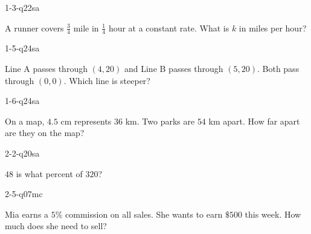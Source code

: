 
\begin{practiceQuestion}{1-3-q22}{sa}
\begin{questionText}
A runner covers $\frac{3}{4}$ mile in $\frac{1}{4}$ hour at a constant rate. What is $k$ in miles per hour?
\end{questionText}
\end{practiceQuestion}

\begin{practiceQuestion}{1-5-q24}{sa}
\begin{questionText}
Line A passes through $(4, 20)$ and Line B passes through $(5, 20)$. Both pass through $(0, 0)$. Which line is steeper?
\end{questionText}
\end{practiceQuestion}

\begin{practiceQuestion}{1-6-q24}{sa}
\begin{questionText}
On a map, $4.5$ cm represents $36$ km. Two parks are $54$ km apart. How far apart are they on the map?
\end{questionText}
\end{practiceQuestion}

\begin{practiceQuestion}{2-2-q20}{sa}
\begin{questionText}
$48$ is what percent of $320$?
\end{questionText}
\end{practiceQuestion}

\begin{practiceQuestion}{2-5-q07}{mc}
\begin{questionText}
Mia earns a $5\%$ commission on all sales. She wants to earn $\$500$ this week. How much does she need to sell?
\end{questionText}
\end{practiceQuestion}


